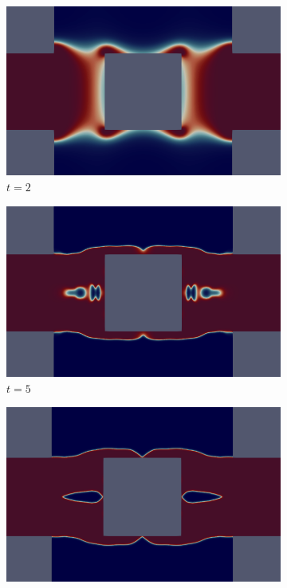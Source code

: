 \begin{figure}[H]
    \centering
    \caption{Heat sink problem: Filtered Distribution}
    \begin{subfigure}{.4\textwidth}
        \includegraphics[width=\textwidth]{imgs/HeatSink/first.png}
        \caption{$t = 2$}
    \end{subfigure}
    \begin{subfigure}{.4\textwidth}
        \includegraphics[width=\textwidth]{imgs/HeatSink/second.png}
        \caption{$t = 5$}
    \end{subfigure}
    \begin{subfigure}{.4\textwidth}
        \includegraphics[width=\textwidth]{imgs/HeatSink/third.png}

\end{subfigure}
\end{figure}
